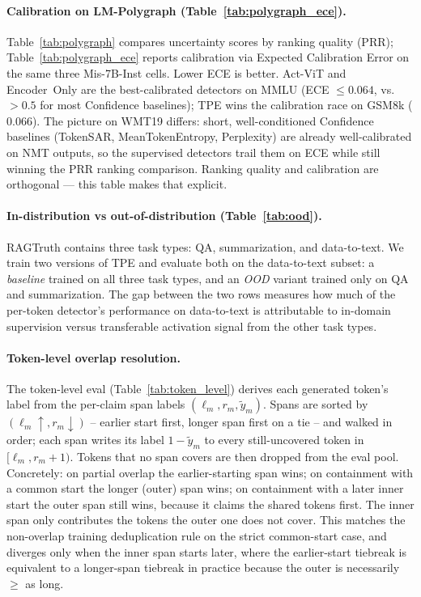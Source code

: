 \paragraph{Calibration on LM-Polygraph (Table~\ref{tab:polygraph_ece}).}
Table~\ref{tab:polygraph} compares uncertainty scores by ranking quality
(PRR); Table~\ref{tab:polygraph_ece} reports calibration via Expected
Calibration Error on the same three Mis-7B-Inst cells. Lower ECE is
better. Act-ViT and Encoder~Only are the best-calibrated detectors on
MMLU (ECE $\leq 0.064$, vs. $> 0.5$ for most Confidence baselines);
TPE wins the calibration race on GSM8k ($0.066$). The picture on
WMT19 differs: short, well-conditioned Confidence baselines
(TokenSAR, MeanTokenEntropy, Perplexity) are already well-calibrated on
NMT outputs, so the supervised detectors trail them on ECE while still
winning the PRR ranking comparison. Ranking quality and calibration are
orthogonal --- this table makes that explicit.

\paragraph{In-distribution vs out-of-distribution (Table~\ref{tab:ood}).}
RAGTruth contains three task types: QA, summarization, and data-to-text.
We train two versions of TPE and evaluate both on the data-to-text
subset: a \emph{baseline} trained on all three task types, and an
\emph{OOD} variant trained only on QA and summarization. The gap
between the two rows measures how much of the per-token detector's
performance on data-to-text is attributable to in-domain supervision
versus transferable activation signal from the other task types.

\paragraph{Token-level overlap resolution.}
\label{ablation:overlap_rule}
The token-level eval (Table~\ref{tab:token_level}) derives each generated
token's label from the per-claim span labels
$(\ell_m, r_m, \tilde{y}_m)$. Spans are sorted by
$(\ell_m\!\uparrow, r_m\!\downarrow)$ -- earlier start first, longer
span first on a tie -- and walked in order; each span writes its
label $1-\tilde{y}_m$ to every still-uncovered token in
$[\ell_m, r_m\!+\!1)$. Tokens that no span covers are then dropped
from the eval pool. Concretely: on partial overlap the earlier-starting
span wins; on containment with a common start the longer (outer)
span wins; on containment with a later inner start the outer span
still wins, because it claims the shared tokens first. The inner
span only contributes the tokens the outer one does not cover.
This matches the non-overlap training deduplication rule on the
strict common-start case, and diverges only when the inner span
starts later, where the earlier-start tiebreak is equivalent to a
longer-span tiebreak in practice because the outer is necessarily
$\geq$ as long.

